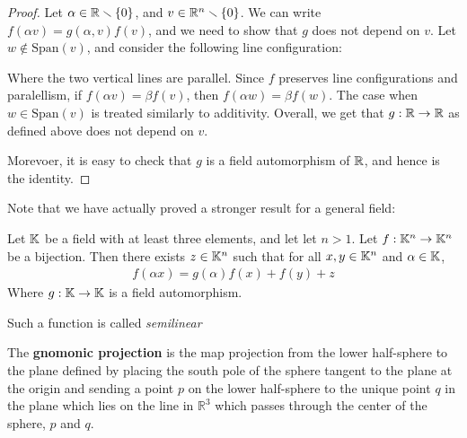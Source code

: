 \begin{proof}
  Let $\alpha\in \mathbb{R}\smallsetminus\{0\}$, and $v\in \mathbb{R}^n\smallsetminus \{0\}$. We 
  can write $f(\alpha v) = g(\alpha,v)f(v)$, and we need to show 
  that $g$ does not depend on $v$. Let $w\not\in\mathrm{Span}(v)$, 
  and consider the following line configuration:
  \begin{figure}
    \centering
  \end{figure}
  Where the two vertical lines are parallel. Since $f$ 
  preserves line configurations and paralellism, if 
  $f(\alpha v) = \beta f(v)$, then 
  $f(\alpha w) = \beta f(w)$. The case when 
  $w\in \mathrm{Span}(v)$ is treated similarly to additivity. 
  Overall, we get that $g:\mathbb{R}\to \mathbb{R}$ as defined above 
  does not depend on $v$.

  Morevoer, it is easy to check that $g$ is a field 
  automorphism of $\mathbb{R}$, and hence is the identity.
\end{proof}
Note that we have actually proved a stronger result 
for a general field:
\begin{theorem}
  Let $\mathbb{K}$ be a field with at least three elements, and 
  let let $n>1$. Let $f:\mathbb{K}^n\to \mathbb{K}^n$ be a bijection. Then 
  there exists $z\in \mathbb{K}^n$ such that for all 
  $x,y\in \mathbb{K}^n$ and $\alpha\in \mathbb{K}$,
  \begin{align*}
    f(\alpha x) = g(\alpha)f(x) + f(y) + z
  \end{align*}
  Where $g:\mathbb{K}\to\mathbb{K}$ is a field automorphism.

  Such a function is called \textit{semilinear}
\end{theorem}
\begin{definition}
  The \textbf{gnomonic projection} is the map projection from the
  lower half-sphere to the plane defined by placing the south pole of
  the sphere tangent to the plane at the origin and sending a point
  $p$ on the lower half-sphere to the unique point $q$ in the plane
  which lies on the line in $\mathbb{R}^3$ which passes through the
  center of the sphere, $p$ and $q$.
\end{definition}
	
